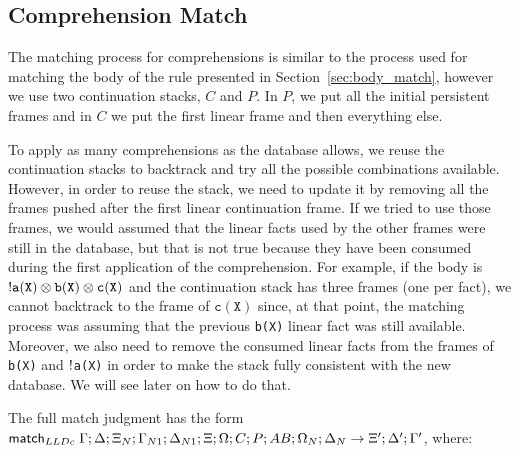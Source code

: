 
\subsection{Comprehension Match}

The matching process for comprehensions is similar to the process used for matching the body of the rule presented
in Section~\ref{sec:body_match}, however we use two continuation stacks, $C$ and $P$. In $P$, we put all the initial persistent frames
and in $C$ we put the first linear frame and then everything else.

To apply as many comprehensions as the database allows, we
reuse the continuation stacks to backtrack and try all the possible combinations available.
However, in order to reuse the stack, we need to update it by removing all the frames pushed after the first linear continuation frame.
If we tried to use those frames, we would assumed that the linear facts used by the other frames were still in the database, but that
is not true because they have been consumed during the first application of the comprehension.
For example, if the body is ${!} \mathtt{a(X)} \otimes \mathtt{b(X)} \otimes \mathtt{c(X)}$ and the continuation stack has three frames (one per fact), we cannot backtrack to the frame of $\mathtt{c(X)}$
since, at that point, the matching process was assuming that the previous \texttt{b(X)} linear fact was still available.
Moreover, we also need to remove the consumed linear facts from the frames of \texttt{b(X)} and ${!}$\texttt{a(X)} in order to make the stack fully consistent with the new database. We will see later on how to do that.

The full match judgment has the form
$\mathsf{match}_{LLDc} \; \Gamma; \Delta; \Xi_N; \Gamma_{N1}; \Delta_{N1}; \Xi; \Omega; C; P; AB; \Omega_N; \Delta_N \rightarrow \Xi'; \Delta'; \Gamma'$, where:

